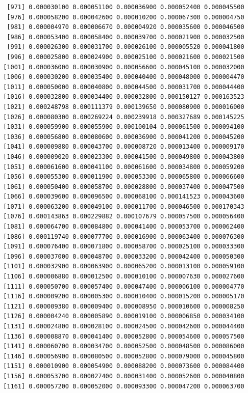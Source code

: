 \documentclass[]{article}
\begin{document}
\begin{verbatim}
  [971] 0.000030100 0.000051100 0.000036900 0.000052400 0.000045500
  [976] 0.000058200 0.000042600 0.000010200 0.000067300 0.000004750
  [981] 0.000004970 0.000006670 0.000004920 0.000035600 0.000046500
  [986] 0.000053400 0.000058400 0.000039700 0.000021900 0.000032500
  [991] 0.000026300 0.000031700 0.000026100 0.000005520 0.000041800
  [996] 0.000025800 0.000024900 0.000025100 0.000021600 0.000021500
 [1001] 0.000036000 0.000030900 0.000056600 0.000045100 0.000032000
 [1006] 0.000030200 0.000035400 0.000040400 0.000048000 0.000004470
 [1011] 0.000050000 0.000040800 0.000044500 0.000031700 0.000044400
 [1016] 0.000032800 0.000034400 0.000032800 0.000150127 0.000163523
 [1021] 0.000248798 0.000111379 0.000139650 0.000080900 0.000016000
 [1026] 0.000080300 0.000269224 0.000239918 0.000327689 0.000145225
 [1031] 0.000059900 0.000055900 0.000100104 0.000061500 0.000094100
 [1036] 0.000056800 0.000080600 0.000036900 0.000041200 0.000045200
 [1041] 0.000009880 0.000043700 0.000008720 0.000013400 0.000009170
 [1046] 0.000009020 0.000023300 0.000041500 0.000049800 0.000043800
 [1051] 0.000061600 0.000041100 0.000061600 0.000034800 0.000059200
 [1056] 0.000055300 0.000011900 0.000053300 0.000065800 0.000066600
 [1061] 0.000050400 0.000058700 0.000028800 0.000037400 0.000047500
 [1066] 0.000039600 0.000096500 0.000068100 0.000141523 0.000043600
 [1071] 0.000063200 0.000049100 0.000011700 0.000046500 0.000170343
 [1076] 0.000143863 0.000229882 0.000107679 0.000057500 0.000056400
 [1081] 0.000064700 0.000084800 0.000041400 0.000053700 0.000062400
 [1086] 0.000119740 0.000077700 0.000016900 0.000063400 0.000076300
 [1091] 0.000076400 0.000071800 0.000058700 0.000025100 0.000033300
 [1096] 0.000037000 0.000048700 0.000033200 0.000042400 0.000050300
 [1101] 0.000032900 0.000063900 0.000065200 0.000013100 0.000059100
 [1106] 0.000006880 0.000012500 0.000010100 0.000007630 0.000027600
 [1111] 0.000050700 0.000057400 0.000047400 0.000006100 0.000004770
 [1116] 0.000009200 0.000005300 0.000010400 0.000015200 0.000005170
 [1121] 0.000009380 0.000009400 0.000008950 0.000010600 0.000008250
 [1126] 0.000004240 0.000005890 0.000019100 0.000006850 0.000034100
 [1131] 0.000024800 0.000028100 0.000024500 0.000042600 0.000044400
 [1136] 0.000008870 0.000041400 0.000052800 0.000054600 0.000057500
 [1141] 0.000060700 0.000034700 0.000052500 0.000048500 0.000086000
 [1146] 0.000056900 0.000080500 0.000052800 0.000079000 0.000045800
 [1151] 0.000010900 0.000054900 0.000088200 0.000073600 0.000084400
 [1156] 0.000053700 0.000027400 0.000031400 0.000052600 0.000040800
 [1161] 0.000057200 0.000052000 0.000093300 0.000047200 0.000063700

\end{verbatim}
\end{document}
